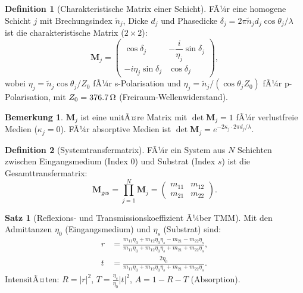 ﻿\documentclass[a4paper,12pt]{article}
\theoremstyle{definition}
\newtheorem{definition}{Definition}[section]
\newtheorem{satz}{Satz}[section]
\newtheorem{bemerkung}{Bemerkung}[section]
\newcommand{\matr}[1]{\mathbf{#1}}
\begin{document}
	\begin{definition}[Charakteristische Matrix einer Schicht]
		\label{def:char-matrix}
		FÃ¼r eine homogene Schicht $j$ mit Brechungsindex $\tilde{n}_j$,
		Dicke $d_j$ und Phasedicke $\delta_j = 2\pi\tilde{n}_j d_j \cos\theta_j/\lambda$
		ist die charakteristische Matrix ($2\times 2$):
		\begin{equation}
			\matr{M}_j = \begin{pmatrix}
				\cos\delta_j & -\dfrac{i}{\eta_j}\sin\delta_j \\[6pt]
				-i\eta_j\sin\delta_j & \cos\delta_j
			\end{pmatrix},
			\label{eq:char-matrix}
		\end{equation}
		wobei $\eta_j = \tilde{n}_j \cos\theta_j / Z_0$ fÃ¼r s-Polarisation
		und $\eta_j = \tilde{n}_j / (\cos\theta_j Z_0)$ fÃ¼r p-Polarisation,
		mit $Z_0 = \SI{376{,}7}{\ohm}$ (Freiraum-Wellenwiderstand).
	\end{definition}
	
	\begin{bemerkung}
		$\matr{M}_j$ ist eine unitÃ¤re Matrix mit $\det\matr{M}_j = 1$ fÃ¼r
		verlustfreie Medien ($\kappa_j = 0$). FÃ¼r absorptive Medien ist
		$\det\matr{M}_j = e^{-2\kappa_j \cdot 2\pi d_j/\lambda}$.
	\end{bemerkung}
	
	\begin{definition}[Systemtransfermatrix]
		\label{def:system-matrix}
		FÃ¼r ein System aus $N$ Schichten zwischen Eingangsmedium (Index 0)
		und Substrat (Index $s$) ist die Gesamttransfermatrix:
		\begin{equation}
			\matr{M}_\mathrm{ges} = \prod_{j=1}^{N} \matr{M}_j
			= \begin{pmatrix} m_{11} & m_{12} \\ m_{21} & m_{22} \end{pmatrix}.
			\label{eq:system-matrix}
		\end{equation}
	\end{definition}
	
	\begin{satz}[Reflexions- und Transmissionskoeffizient Ã¼ber TMM]
		\label{satz:tmm-rt}
		Mit den Admittanzen $\eta_0$ (Eingangsmedium) und $\eta_s$ (Substrat) sind:
		\begin{align}
			r &= \frac{m_{11}\eta_0 + m_{12}\eta_0\eta_s - m_{21} - m_{22}\eta_s}
			{m_{11}\eta_0 + m_{12}\eta_0\eta_s + m_{21} + m_{22}\eta_s},
			\label{eq:tmm-r}\\
			t &= \frac{2\eta_0}
			{m_{11}\eta_0 + m_{12}\eta_0\eta_s + m_{21} + m_{22}\eta_s}.
			\label{eq:tmm-t}
		\end{align}
		IntensitÃ¤ten: $R = |r|^2$, $T = \frac{\eta_s}{\eta_0}|t|^2$,
		$A = 1 - R - T$ (Absorption).
	\end{satz}
	
\end{document}
